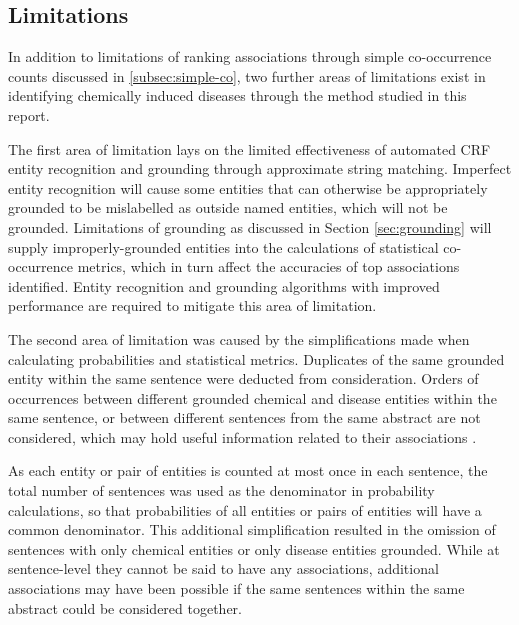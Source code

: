 \documentclass[10pt, oneside]{article}
\begin{document}
\subsection{Limitations}

In addition to limitations of ranking associations through simple co-occurrence counts discussed in \ref{subsec:simple-co}, two further areas of limitations exist in identifying chemically induced diseases through the method studied in this report. 

The first area of limitation lays on the limited effectiveness of automated CRF entity recognition and grounding through approximate string matching. Imperfect entity recognition will cause some entities that can otherwise be appropriately grounded to be mislabelled as outside named entities, which will not be grounded. Limitations of grounding as discussed in Section \ref{sec:grounding} will supply improperly-grounded entities into the calculations of statistical co-occurrence metrics, which in turn affect the accuracies of top associations identified. Entity recognition and grounding algorithms with improved performance are required to mitigate this area of limitation.

The second area of limitation was caused by the simplifications made when calculating probabilities and statistical metrics. Duplicates of the same grounded entity within the same sentence were deducted from consideration. Orders of occurrences between different grounded chemical and disease entities within the same sentence, or between different sentences from the same abstract are not considered, which may hold useful information related to their associations \cite{galleguillos2008object}. 

As each entity or pair of entities is counted at most once in each sentence, the total number of sentences was used as the denominator in probability calculations, so that probabilities of all entities or pairs of entities will have a common denominator. This additional simplification resulted in the omission of sentences with only chemical entities or only disease entities grounded. While at sentence-level they cannot be said to have any associations, additional associations may have been possible if the same sentences within the same abstract could be considered together.


\small{}
\end{document}

